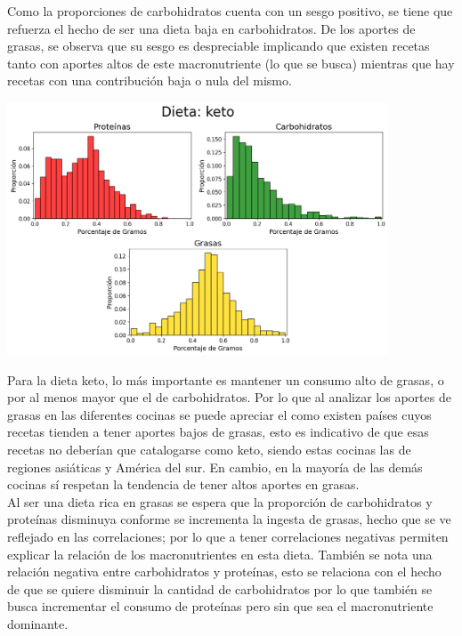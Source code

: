 \documentclass[12pt,a4paper]{article}
\begin{document}
            Como la proporciones de carbohidratos cuenta con un sesgo positivo, se 
            tiene que refuerza el hecho de ser una dieta baja en carbohidratos. 
            De los aportes de grasas, se observa que su sesgo es despreciable implicando 
            que existen recetas tanto con aportes altos de este macronutriente (lo que se 
            busca) mientras que hay recetas con una contribución baja o nula del mismo.
            
            \begin{center}
                \includegraphics[width=0.85\textwidth]{Resources/2_03_plot_02.png}
            \end{center}

            Para la dieta keto, lo más importante es mantener un consumo alto de grasas, o 
            por al menos mayor que el de carbohidratos. Por lo que al analizar los aportes de grasas 
            en las diferentes cocinas se puede apreciar el como existen países cuyos recetas 
            tienden a tener aportes bajos de grasas, esto es indicativo de que esas recetas no 
            deberían que catalogarse como keto, siendo estas cocinas las de regiones asiáticas
            y América del sur. En cambio, en la mayoría de las demás cocinas sí respetan la 
            tendencia de tener altos aportes en grasas.\\

            Al ser una dieta rica en grasas se espera que la proporción de carbohidratos y proteínas 
            disminuya conforme se incrementa la ingesta de grasas, hecho que se ve reflejado en las 
            correlaciones; por lo que a tener correlaciones negativas permiten explicar la relación 
            de los macronutrientes en esta dieta. También se nota una relación negativa entre carbohidratos y 
            proteínas, esto se relaciona con el hecho de que se quiere disminuir la cantidad de carbohidratos 
            por lo que también se busca incrementar el consumo de proteínas pero sin que sea el macronutriente 
            dominante.
\end{document}
